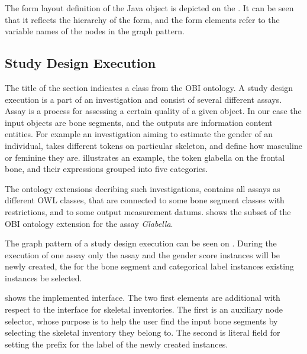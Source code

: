 
The form layout definition of the Java object is depicted on the . It can be seen that it reflects the hierarchy of the form, and the form elements refer to the variable names of the nodes in the graph pattern.


\subsection{Study Design Execution} \label{43}

The title of the section indicates a class from the OBI ontology. A study design execution is a part of an investigation and consist of several different assays. Assay is a process for assessing a certain quality of a given object. In our case the input objects are bone segments, and the outputs are information content entities. For example an investigation aiming to estimate the gender of an individual, takes different tokens on particular skeleton, and define how masculine or feminine they are.  illustrates an example, the token glabella on the frontal bone, and their expressions grouped into five categories.



The ontology extensions decribing such investigations, contains all assays as different OWL classes, that are connected to some bone segment classes with restrictions, and to some output measurement datums.  shows the subset of the OBI ontology extension for the assay \textit{Glabella}. 



The graph pattern of a study design execution can be seen on . During the execution of one assay only the assay and the gender score instances will be newly created, the for the bone segment and categorical label instances existing instances be selected. 


 shows the implemented interface. The two first elements are additional with respect to the interface for skeletal inventories. The first is an auxiliary node selector, whose purpose is to help the user find the input bone segments by selecting the skeletal inventory they belong to. The second is literal field for setting the prefix for the label of the newly created instances. 

